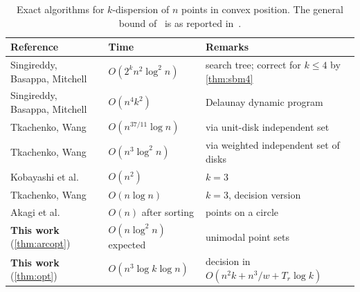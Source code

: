 \documentclass[11pt,a4paper]{article}
\theoremstyle{definition}
\theoremstyle{remark}
\newcommand{\Tr}{T_r}
\begin{document}
\begin{table}[tb]
\centering
\caption{Exact algorithms for $k$-dispersion of $n$ points in convex position.
The general bound of~\cite{tw25} is as reported in~\cite{tw26}.}
\label{tab:known}
\small\setlength{\tabcolsep}{4pt}
\begin{tabular}{@{}lll@{}}
\toprule
Reference & Time & Remarks\\
\midrule
Singireddy, Basappa, Mitchell~\cite{sbm} & $O(2^k n^2\log^2 n)$ & search tree; correct for $k\le4$ by \cref{thm:sbm4}\\
Singireddy, Basappa, Mitchell~\cite{sbm} & $O(n^4k^2)$ & Delaunay dynamic program\\
Tkachenko, Wang~\cite{tw25} & $O(n^{37/11}\log n)$ & via unit-disk independent set\\
Tkachenko, Wang~\cite{tw26} & $O(n^3\log^2 n)$ & via weighted independent set of disks\\
Kobayashi et al.~\cite{kobayashi} & $O(n^2)$ & $k=3$\\
Tkachenko, Wang~\cite{tw25} & $O(n\log n)$ & $k=3$, decision version\\
Akagi et al.~\cite{akagi} & $O(n)$ after sorting & points on a circle\\
\midrule
\textbf{This work} (\cref{thm:arcopt}) & $O(n\log^2n)$ expected & unimodal point sets\\
\textbf{This work} (\cref{thm:opt}) & $O(n^3\log k\log n)$ & decision in $O(n^2k+n^3/w+\Tr\log k)$\\
\bottomrule
\end{tabular}
\end{table}
\end{document}
